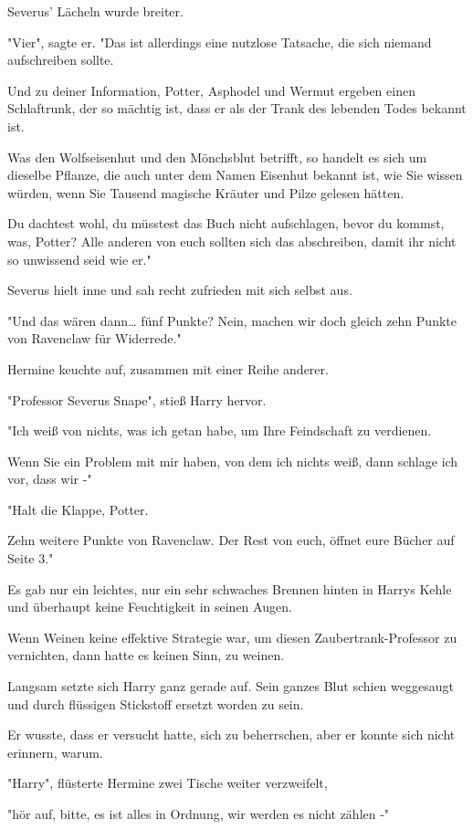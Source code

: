 {Severus' Lächeln wurde breiter.

"Vier", sagte er. "Das ist allerdings eine nutzlose Tatsache, die sich niemand aufschreiben sollte.

Und zu deiner Information, Potter, Asphodel und Wermut ergeben einen Schlaftrunk, der so mächtig ist, dass er als der Trank des lebenden Todes bekannt ist.

Was den Wolfseisenhut und den Mönchsblut betrifft, so handelt es sich um dieselbe Pflanze, die auch unter dem Namen Eisenhut bekannt ist, wie Sie wissen würden, wenn Sie Tausend magische Kräuter und Pilze gelesen hätten.

Du dachtest wohl, du müsstest das Buch nicht aufschlagen, bevor du kommst, was, Potter? Alle anderen von euch sollten sich das abschreiben, damit ihr nicht so unwissend seid wie er."

Severus hielt inne und sah recht zufrieden mit sich selbst aus.

"Und das wären dann… fünf Punkte? Nein, machen wir doch gleich zehn Punkte von Ravenclaw für Widerrede."

Hermine keuchte auf, zusammen mit einer Reihe anderer.

"Professor Severus Snape", stieß Harry hervor.

"Ich weiß von nichts, was ich getan habe, um Ihre Feindschaft zu verdienen.

Wenn Sie ein Problem mit mir haben, von dem ich nichts weiß, dann schlage ich vor, dass wir -"

"Halt die Klappe, Potter.

Zehn weitere Punkte von Ravenclaw. Der Rest von euch, öffnet eure Bücher auf Seite 3."

Es gab nur ein leichtes, nur ein sehr schwaches Brennen hinten in Harrys Kehle und überhaupt keine Feuchtigkeit in seinen Augen.

Wenn Weinen keine effektive Strategie war, um diesen Zaubertrank-Professor zu vernichten, dann hatte es keinen Sinn, zu weinen.

Langsam setzte sich Harry ganz gerade auf. Sein ganzes Blut schien weggesaugt und durch flüssigen Stickstoff ersetzt worden zu sein.

Er wusste, dass er versucht hatte, sich zu beherrschen, aber er konnte sich nicht erinnern, warum.

"Harry", flüsterte Hermine zwei Tische weiter verzweifelt,

"hör auf, bitte, es ist alles in Ordnung, wir werden es nicht zählen -"

}
